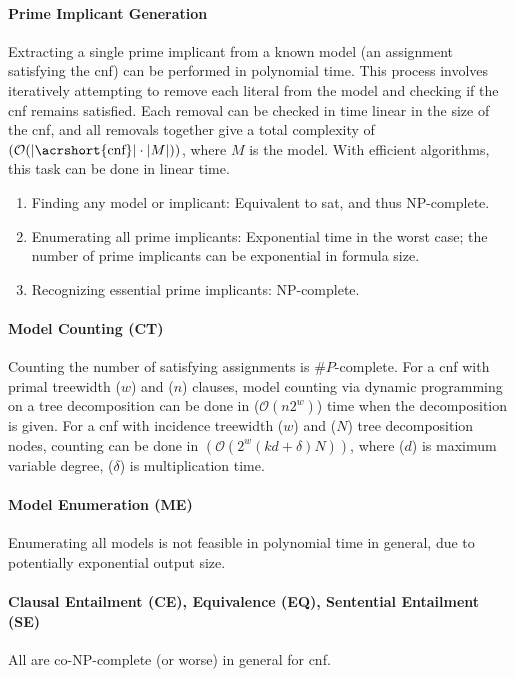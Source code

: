 \paragraph{Prime Implicant Generation}
Extracting a single prime implicant from a known model (an assignment satisfying the \acrshort{cnf}) can be performed in polynomial time. This process involves iteratively attempting to remove each literal from the model and checking if the \acrshort{cnf} remains satisfied. Each removal can be checked in time linear in the size of the \acrshort{cnf}, and all removals together give a total complexity of $(\mathcal{O}(|\text{\acrshort{cnf}}| \cdot |M|))$, where $M$ is the model. With efficient algorithms, this task can be done in linear time.
\begin{enumerate}
    \item Finding any model or implicant: Equivalent to \acrshort{sat}, and thus NP-complete.
    \item Enumerating all prime implicants: Exponential time in the worst case; the number of prime implicants can be exponential in formula size.
    \item Recognizing essential prime implicants: NP-complete.
\end{enumerate}

\paragraph{Model Counting (CT)}
Counting the number of satisfying assignments is $\#P$-complete.
For a \acrshort{cnf} with primal treewidth ($w$) and ($n$) clauses, model counting via dynamic programming on a tree decomposition can be done in ($\mathcal{O}(n2^w)$) time when the decomposition is given.
For a \acrshort{cnf} with incidence treewidth ($w$) and ($N$) tree decomposition nodes, counting can be done in $(\mathcal{O}(2^w(kd+\delta)N))$, where ($d$) is maximum variable degree, ($\delta$) is multiplication time.

\paragraph{Model Enumeration (ME)}
Enumerating all models is not feasible in polynomial time in general, due to potentially exponential output size.

\paragraph{Clausal Entailment (CE), Equivalence (EQ), Sentential Entailment (SE)}
All are co-NP-complete (or worse) in general for \acrshort{cnf}.

